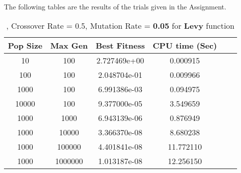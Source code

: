 \documentclass[12pt]{article}
\begin{document}
The following tables are the results of the trials given in the Assignment. 
	
	 
	\begin{table}[H]
		\caption{, Crossover Rate = 0.5, Mutation Rate = \textbf{0.05} for \textbf{Levy} function}
		\label{table:1}
		\centering
		\begin{tabular}{c c c c c c}
			\hline
			Pop Size & Max Gen & Best Fitness & CPU time (Sec) \\
			\hline
			10  & 100    & 
2.727469e+00

 & 
0.000915

 & &\\
			100 & 100    & 2.048704e-01 & 0.009966 & &\\
			1000& 100    & 
6.991386e-03 &
0.094975

 &   & &\\
			10000& 100    & 
9.377000e-05 &
3.549659

 &   & &\\
			\hline
			1000  & 1000   & 
6.943139e-06 &
0.876949

 & & &\\
			1000 & 10000  & 
3.366370e-08 &
8.680238

  &  & &\\
			1000& 100000 & 
4.401841e-08 &
11.772110

  &   & &\\
			1000& 1000000 & 
1.013187e-08 &
12.256150

  &   & &\\
			\hline
		\end{tabular}
	\end{table}
\end{document}
